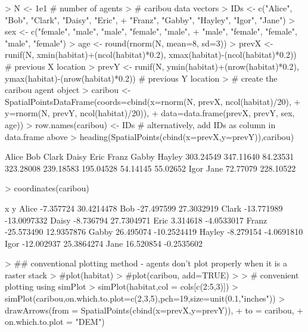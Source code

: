 \documentclass{article}
\begin{document}
\begin{Schunk}
\begin{Sinput}
> N <- 1e1 # number of agents
> # caribou data vectors
> IDs <- c("Alice", "Bob", "Clark", "Daisy", "Eric",
+          "Franz", "Gabby", "Hayley", "Igor", "Jane")
> sex <- c("female", "male", "male", "female", "male",
+          "male", "female", "female", "male", "female")
> age <- round(rnorm(N, mean=8, sd=3))
> prevX <- runif(N, xmin(habitat)+(ncol(habitat)*0.2), xmax(habitat)-(ncol(habitat)*0.2)) # previous X location
> prevY <- runif(N, ymin(habitat)+(nrow(habitat)*0.2), ymax(habitat)-(nrow(habitat)*0.2)) # previous Y location
> # create the caribou agent object
> caribou <- SpatialPointsDataFrame(coords=cbind(x=rnorm(N, prevX, ncol(habitat)/20),
+                                                y=rnorm(N, prevY, ncol(habitat)/20)),
+                                   data=data.frame(prevX, prevY, sex, age))
> row.names(caribou) <- IDs # alternatively, add IDs as column in data.frame above
> heading(SpatialPoints(cbind(x=prevX,y=prevY)),caribou)
\end{Sinput}
\begin{Soutput}
    Alice       Bob     Clark     Daisy      Eric     Franz     Gabby    Hayley 
303.24549 347.11640  84.23531 323.28008 239.18583 195.04528  54.14145  55.02652 
     Igor      Jane 
 72.77079 228.10522 
\end{Soutput}
\begin{Sinput}
> coordinates(caribou)
\end{Sinput}
\begin{Soutput}
                x           y
Alice   -7.357724  30.4214478
Bob    -27.497599  27.3032919
Clark  -13.771989 -13.0097332
Daisy   -8.736794  27.7304971
Eric     3.314618  -4.0533017
Franz  -25.573490  12.9357876
Gabby   26.495074 -10.2524419
Hayley  -8.279154  -4.0691810
Igor   -12.002937  25.3864274
Jane    16.520854  -0.2535602
\end{Soutput}
\begin{Sinput}
> ## conventional plotting method - agents don't plot properly when it is a raster stack
> #plot(habitat)
> #plot(caribou, add=TRUE)
> 
> # convenient plotting using simPlot
> simPlot(habitat,col = cols[c(2:5,3)])
> simPlot(caribou,on.which.to.plot=c(2,3,5),pch=19,size=unit(0.1,"inches"))
> drawArrows(from = SpatialPoints(cbind(x=prevX,y=prevY)),
+            to = caribou,
+            on.which.to.plot = "DEM")
\end{Sinput}
\end{Schunk}
\end{document}
